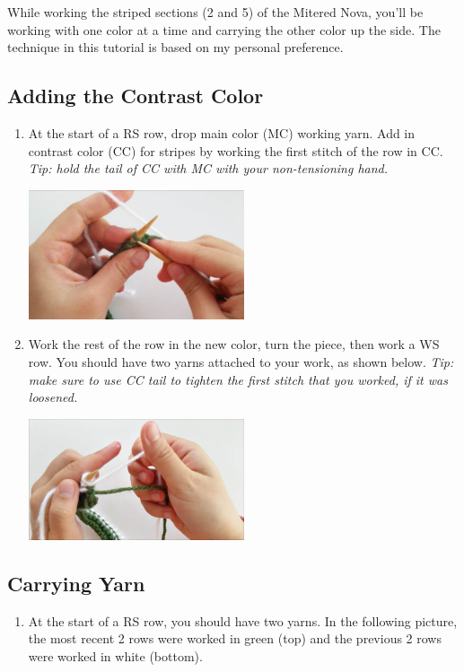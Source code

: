\documentclass[12pt]{article}
\begin{document}
\begin{multicols}{2}
While working the striped sections (2 and 5) of the Mitered Nova, you'll be working with one color at a time and carrying the other color up the side. The technique in this tutorial is based on my personal preference.

\subsection*{Adding the Contrast Color}
\begin{enumerate}
\item At the start of a RS row, drop main color (MC) working yarn. Add in contrast color (CC) for stripes by working the first stitch of the row in CC. \emph{Tip: hold the tail of CC with MC with your non-tensioning hand.}

\includegraphics[width=2.5in]{addCC.jpg}

\item Work the rest of the row in the new color, turn the piece, then work a WS row. You should have two yarns attached to your work, as shown below. \emph{Tip: make sure to use CC tail to tighten the first stitch that you worked, if it was loosened.}

\includegraphics[width=2.5in]{step2_cross.jpg}
\end{enumerate}

\vfill \columnbreak

\subsection*{Carrying Yarn}
\begin{enumerate}
\item At the start of a RS row, you should have two yarns. In the following picture, the most recent 2 rows were worked in green (top) and the previous 2 rows were worked in white (bottom).


\end{enumerate}
\end{multicols}
\end{document}
